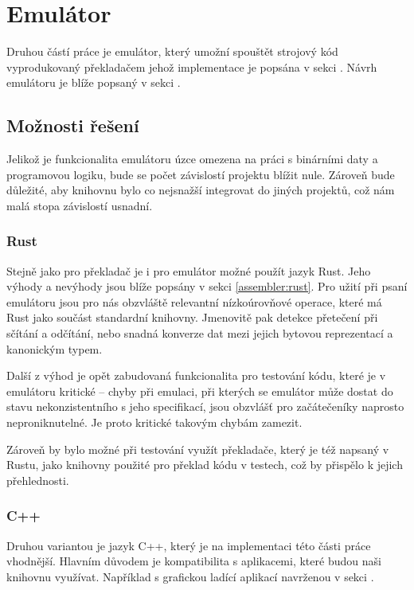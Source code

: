 \chapter{Emulátor}

Druhou částí práce je emulátor, který umožní spouštět strojový kód vyprodukovaný překladačem jehož implementace je popsána v sekci . Návrh emulátoru je blíže popsaný v sekci .

\section{Možnosti řešení}

Jelikož je funkcionalita emulátoru úzce omezena na práci s binárními daty a programovou logiku, bude se počet závislostí projektu blížit nule. Zároveň bude důležité, aby knihovnu bylo co nejsnažší integrovat do jiných projektů, což nám malá stopa závislostí usnadní.

\subsection{Rust}

Stejně jako pro překladač je i pro emulátor možné použít jazyk Rust. Jeho výhody a nevýhody jsou blíže popsány v sekci \ref{assembler:rust}. Pro užití při psaní emulátoru jsou pro nás obzvláště relevantní nízkoúrovňové operace, které má Rust jako součást standardní knihovny. Jmenovitě pak detekce přetečení při sčítání a odčítání\todocite, nebo snadná konverze dat mezi jejich bytovou reprezentací a kanonickým typem\todocite.

Další z výhod je opět zabudovaná funkcionalita pro testování kódu, které je v emulátoru kritické -- chyby při emulaci, při kterých se emulátor může dostat do stavu nekonzistentního s jeho specifikací, jsou obzvlášť pro začátečeníky naprosto neproniknutelné. Je proto kritické takovým chybám zamezit.

Zároveň by bylo možné při testování využít překladače, který je též napsaný v Rustu, jako knihovny použité pro překlad kódu v testech, což by přispělo k jejich přehlednosti.

\subsection{C++}

Druhou variantou je jazyk C++, který je na implementaci této části práce vhodnější. Hlavním důvodem je kompatibilita s aplikacemi, které budou naši knihovnu využívat. Například s grafickou ladící aplikací navrženou v sekci .

